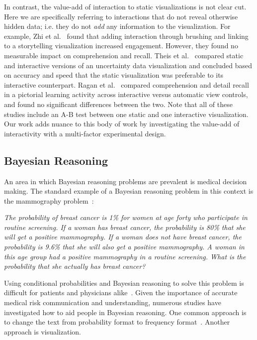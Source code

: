 In contrast, the value-add of interaction to static visualizations is not clear cut. Here we are specifically referring to interactions that do not reveal otherwise hidden data; i.e. they do not \textit{add} any information to the visualization. For example, Zhi et al.~\cite{zhi2019linking} found that adding interaction through brushing and linking to a storytelling visualization increased engagement. However, they found no measurable impact on comprehension and recall.
Theis et al.~\cite{theis2016Ergonomic} compared static and interactive versions of an uncertainty data visualization and concluded based on accuracy and speed that the static visualization was preferable to its interactive counterpart.
Ragan et al.~\cite{ragan2012Spatial} compared comprehension and detail recall in a pictorial learning activity across interactive versus automatic view controls, and found no significant differences between the two. 
Note that all of these studies include an A-B test between one static and one interactive visualization. Our work adds nuance to this body of work by investigating the value-add of interactivity with a multi-factor experimental design.  
  
\subsection{Bayesian Reasoning}
An area in which Bayesian reasoning problems are prevalent is medical decision making. The standard example of a Bayesian reasoning problem in this context is the mammography problem~\cite{gigerenzer1995How}: 

\textit{The probability of breast cancer is 1\% for women at age forty who participate in routine screening. If a woman has breast cancer, the probability is 80\% that she will get a positive mammography. If a woman does not have breast cancer, the probability is 9.6\% that she will also get a positive mammography.
A woman in this age group had a positive mammography in a routine screening. What is the probability that she actually has breast cancer?}

Using conditional probabilities and Bayesian reasoning to solve this problem is difficult for patients and physicians alike~\cite{eddy1982Probabilistic}. Given the importance of accurate medical risk communication and understanding, numerous studies have investigated how to aid people in Bayesian reasoning. One common approach is to change the text from probability format to frequency format~\cite{gigerenzer1995How, tsai2011Interactive}.    
Another approach is visualization. 


